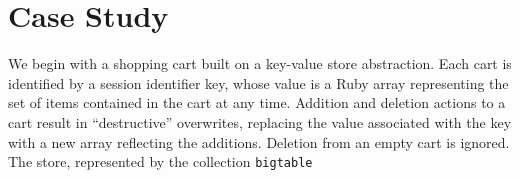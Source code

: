 \section{Case Study}
\label{sec:case}

We begin with a shopping
cart built on a key-value store abstraction.  Each cart is identified by a
session identifier key, whose value is a Ruby array
representing the set of items contained in the cart at any time.  Addition
and deletion actions to a cart result in ``destructive'' overwrites,
replacing the value associated with the key with a new array reflecting
the additions.  Deletion from an empty cart is ignored. 
 The store, represented
by the collection \texttt{bigtable}

